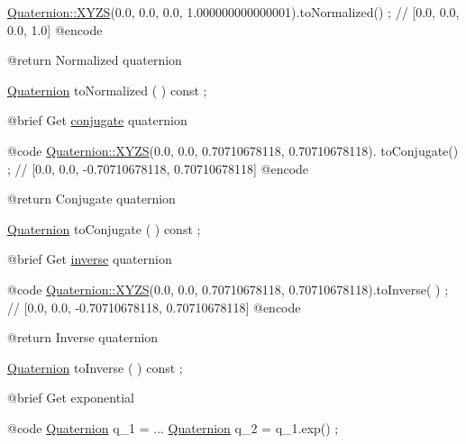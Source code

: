 \begin{DoxyCode}
                        \hyperlink{classostk_1_1math_1_1geom_1_1d3_1_1trf_1_1rot_1_1_quaternion_ac57ea57a4033622ed1389101b2e58c76}{Quaternion::XYZS}(0.0, 0.0, 0.0, 1.000000000000001).toNormalized() ;
       \textcolor{comment}{// [0.0, 0.0, 0.0, 1.0]}
    @encode
   
    @\textcolor{keywordflow}{return}             Normalized quaternion

\hyperlink{classostk_1_1math_1_1geom_1_1d3_1_1trf_1_1rot_1_1_quaternion_ad9fd7d8eb5effb4d4e0394bbb5bb86dc}{Quaternion}              toNormalized                                ( ) \textcolor{keyword}{const} ;

    @brief              Get \hyperlink{classostk_1_1math_1_1geom_1_1d3_1_1trf_1_1rot_1_1_quaternion_a7d975785f2a7f4cc83d9410e37908b11}{conjugate} quaternion
   
    @code
                        \hyperlink{classostk_1_1math_1_1geom_1_1d3_1_1trf_1_1rot_1_1_quaternion_ac57ea57a4033622ed1389101b2e58c76}{Quaternion::XYZS}(0.0, 0.0, 0.70710678118, 0.70710678118).
      toConjugate() ; \textcolor{comment}{// [0.0, 0.0, -0.70710678118, 0.70710678118]}
    @encode
   
    @\textcolor{keywordflow}{return}             Conjugate quaternion

\hyperlink{classostk_1_1math_1_1geom_1_1d3_1_1trf_1_1rot_1_1_quaternion_ad9fd7d8eb5effb4d4e0394bbb5bb86dc}{Quaternion}              toConjugate                                 ( ) \textcolor{keyword}{const} ;

    @brief              Get \hyperlink{classostk_1_1math_1_1geom_1_1d3_1_1trf_1_1rot_1_1_quaternion_a75b09159acd3346e3ad848b0162181f4}{inverse} quaternion
   
    @code
                        \hyperlink{classostk_1_1math_1_1geom_1_1d3_1_1trf_1_1rot_1_1_quaternion_ac57ea57a4033622ed1389101b2e58c76}{Quaternion::XYZS}(0.0, 0.0, 0.70710678118, 0.70710678118).toInverse(
      ) ; \textcolor{comment}{// [0.0, 0.0, -0.70710678118, 0.70710678118]}
    @encode
   
    @\textcolor{keywordflow}{return}             Inverse quaternion

\hyperlink{classostk_1_1math_1_1geom_1_1d3_1_1trf_1_1rot_1_1_quaternion_ad9fd7d8eb5effb4d4e0394bbb5bb86dc}{Quaternion}              toInverse                                   ( ) \textcolor{keyword}{const} ;

    @brief              Get exponential
   
    @code
                        \hyperlink{classostk_1_1math_1_1geom_1_1d3_1_1trf_1_1rot_1_1_quaternion_ad9fd7d8eb5effb4d4e0394bbb5bb86dc}{Quaternion} q\_1 = ...
                        \hyperlink{classostk_1_1math_1_1geom_1_1d3_1_1trf_1_1rot_1_1_quaternion_ad9fd7d8eb5effb4d4e0394bbb5bb86dc}{Quaternion} q\_2 = q\_1.exp() ;
\end{DoxyCode}



